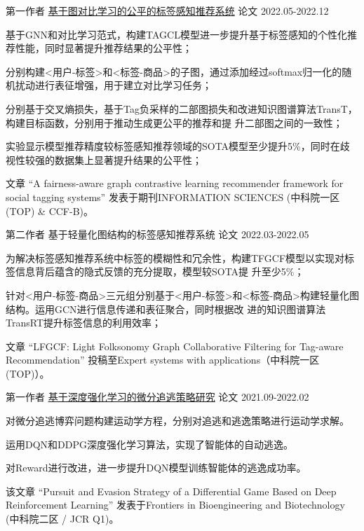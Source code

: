 \begin{cventries}
\cventry
{第一作者} %
{\href{https://www.sciencedirect.com/science/article/pii/S0020025523006497}{基于图对比学习的公平的标签感知推荐系统}} %
{论文} %
{2022.05-2022.12} %
{
  \begin{cvitems} %
    \item {基于GNN和对比学习范式，构建TAGCL模型进一步提升基于标签感知的个性化推荐性能，同时显著提升推荐结果的公平性；}
    \item {分别构建<用户-标签>和<标签-商品>的子图，通过添加经过softmax归一化的随机扰动进行表征增强，用于建立对比学习任务；}
    \item {分别基于交叉熵损失，基于Tag负采样的二部图损失和改进知识图谱算法TransT，构建目标函数，分别用于推动生成更公平的推荐和提
    升二部图之间的一致性；}
    \item {实验显示模型推荐精度较标签感知推荐领域的SOTA模型至少提升5\%，同时在歧视性较强的数据集上显著提升结果的公平性；}
    \item {文章 “A fairness-aware graph contrastive learning recommender framework for social tagging systems” 发表于期刊INFORMATION SCIENCES (中科院一区(TOP) \& CCF-B)。}   
  \end{cvitems}
}

\cventry
{第二作者} %
{基于轻量化图结构的标签感知推荐系统} %
{论文} %
{2022.03-2022.05} %
{
  \begin{cvitems} %
    \item {为解决标签感知推荐系统中标签的模糊性和冗余性，构建TFGCF模型以实现对标签信息背后蕴含的隐式反馈的充分提取，模型较SOTA提 升至少5\%；}
    \item {针对<用户-标签-商品>三元组分别基于<用户-标签>和<标签-商品>构建轻量化图结构。运用GCN进行信息传递和表征聚合，同时根据改 进的知识图谱算法TransRT提升标签信息的利用效率；}
    \item {文章 “LFGCF: Light Folksonomy Graph Collaborative Filtering for Tag-aware Recommendation” 投稿至Expert systems 
    with applications（中科院一区(TOP)）。}
  \end{cvitems}
}

\cventry
{第一作者} %
{\href{https://www.frontiersin.org/articles/10.3389/fbioe.2022.827408/full}{基于深度强化学习的微分追逃策略研究}} %
{论文} %
{2021.09-2022.02} %
{
  \begin{cvitems} %
    \item {对微分追逃博弈问题构建运动学方程，分别对追逃和逃逸策略进行运动学求解。}
    \item {运用DQN和DDPG深度强化学习算法，实现了智能体的自动逃逸。}
    \item {对Reward进行改进，进一步提升DQN模型训练智能体的逃逸成功率。}
    \item {该文章 “Pursuit and Evasion Strategy of a Differential Game Based on Deep Reinforcement Learning” 发表于Frontiers in Bioengineering and Biotechnology (中科院二区 / JCR Q1)。}
  \end{cvitems}
}


\end{cventries}
